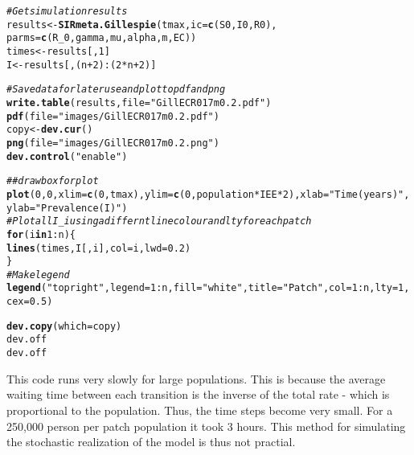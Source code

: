 \documentclass{article}\usepackage[]{graphicx}\usepackage[]{color}
\makeatletter
\newcommand{\hlnum}[1]{\textcolor[rgb]{0.686,0.059,0.569}{#1}}%
\newcommand{\hlstr}[1]{\textcolor[rgb]{0.192,0.494,0.8}{#1}}%
\newcommand{\hlcom}[1]{\textcolor[rgb]{0.678,0.584,0.686}{\textit{#1}}}%
\newcommand{\hlopt}[1]{\textcolor[rgb]{0,0,0}{#1}}%
\newcommand{\hlstd}[1]{\textcolor[rgb]{0.345,0.345,0.345}{#1}}%
\newcommand{\hlkwa}[1]{\textcolor[rgb]{0.161,0.373,0.58}{\textbf{#1}}}%
\newcommand{\hlkwb}[1]{\textcolor[rgb]{0.69,0.353,0.396}{#1}}%
\newcommand{\hlkwc}[1]{\textcolor[rgb]{0.333,0.667,0.333}{#1}}%
\newcommand{\hlkwd}[1]{\textcolor[rgb]{0.737,0.353,0.396}{\textbf{#1}}}%
\newenvironment{kframe}{%
 \def\at@end@of@kframe{}%
 \ifinner\ifhmode%
  \def\at@end@of@kframe{\end{minipage}}%
  \begin{minipage}{\columnwidth}%
 \fi\fi%
 \def\FrameCommand##1{\hskip\@totalleftmargin \hskip-\fboxsep
 \colorbox{shadecolor}{##1}\hskip-\fboxsep
     \hskip-\linewidth \hskip-\@totalleftmargin \hskip\columnwidth}%
 \MakeFramed {\advance\hsize-\width
   \@totalleftmargin\z@ \linewidth\hsize
   \@setminipage}}%
 {\par\unskip\endMakeFramed%
 \at@end@of@kframe}
\newenvironment{knitrout}{}{} %
\makeatother
\begin{document}
\begin{knitrout}
\begin{kframe}
\begin{alltt}
 \hlcom{#Get simulation results}
\hlstd{results} \hlkwb{<-} \hlkwd{SIRmeta.Gillespie}\hlstd{(tmax,}\hlkwc{ic}\hlstd{=}\hlkwd{c}\hlstd{(S0,I0,R0),}
                             \hlkwc{parms}\hlstd{=}\hlkwd{c}\hlstd{(R_0,gamma,mu,alpha,m,EC))}
\hlstd{times}\hlkwb{<-}\hlstd{results[,}\hlnum{1}\hlstd{]}
\hlstd{I} \hlkwb{<-} \hlstd{results[,(n}\hlopt{+}\hlnum{2}\hlstd{)}\hlopt{:}\hlstd{(}\hlnum{2}\hlopt{*}\hlstd{n}\hlopt{+}\hlnum{2}\hlstd{)]}

\hlcom{#Save data for later use and plot to pdf and png}
\hlkwd{write.table}\hlstd{(results,}\hlkwc{file}\hlstd{=}\hlstr{"GillECR017m0.2.pdf"}\hlstd{)}
\hlkwd{pdf}\hlstd{(}\hlkwc{file}\hlstd{=}\hlstr{"images/GillECR017m0.2.pdf"}\hlstd{)}
\hlstd{copy} \hlkwb{<-} \hlkwd{dev.cur}\hlstd{()}
\hlkwd{png}\hlstd{(}\hlkwc{file}\hlstd{=}\hlstr{"images/GillECR017m0.2.png"}\hlstd{)}
\hlkwd{dev.control}\hlstd{(}\hlstr{"enable"}\hlstd{)}

\hlcom{## draw box for plot}
  \hlkwd{plot}\hlstd{(}\hlnum{0}\hlstd{,}\hlnum{0}\hlstd{,}\hlkwc{xlim}\hlstd{=}\hlkwd{c}\hlstd{(}\hlnum{0}\hlstd{,tmax),}\hlkwc{ylim}\hlstd{=}\hlkwd{c}\hlstd{(}\hlnum{0}\hlstd{,population}\hlopt{*}\hlstd{IEE}\hlopt{*}\hlnum{2}\hlstd{),}\hlkwc{xlab}\hlstd{=}\hlstr{"Time (years)"}\hlstd{,}
       \hlkwc{ylab}\hlstd{=}\hlstr{"Prevalence (I)"}\hlstd{)}
  \hlcom{#Plot all I_i using a differnt line colour and lty for each patch}
\hlkwa{for} \hlstd{(i} \hlkwa{in} \hlnum{1}\hlopt{:}\hlstd{n) \{}
    \hlkwd{lines}\hlstd{(times, I[,i],}\hlkwc{col}\hlstd{=i,}\hlkwc{lwd}\hlstd{=}\hlnum{0.2}\hlstd{)}
\hlstd{\}}
  \hlcom{#Make legend }
  \hlkwd{legend}\hlstd{(}\hlstr{"topright"}\hlstd{,}\hlkwc{legend}\hlstd{=}\hlnum{1}\hlopt{:}\hlstd{n,}\hlkwc{fill}\hlstd{=}\hlstr{"white"}\hlstd{,}\hlkwc{title}\hlstd{=}\hlstr{"Patch"}\hlstd{,}\hlkwc{col}\hlstd{=}\hlnum{1}\hlopt{:}\hlstd{n,}\hlkwc{lty}\hlstd{=}\hlnum{1}\hlstd{,}\hlkwc{cex}\hlstd{=}\hlnum{0.5}\hlstd{)}


\hlkwd{dev.copy}\hlstd{(}\hlkwc{which}\hlstd{=copy)}
\hlstd{dev.off}
\hlstd{dev.off}
\end{alltt}
\end{kframe}
\end{knitrout}
This code runs very slowly for large populations. This is because the average waiting time between each transition is the inverse of the total rate - which is proportional to the population. Thus, the time steps become very small. For a 250,000 person per patch population it took 3 hours. This method for simulating the stochastic realization of the model is thus not practial.
\end{document}
